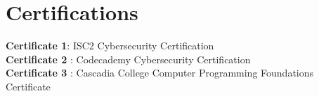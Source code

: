 \documentclass[letterpaper,11pt]{article}
\makeatletter
\newcommand{\resumeItem}[1]{
  \item\small{
    {#1 \vspace{-2pt}}
  }
}
\newcommand{\resumeProjectHeading}[2]{
    \item
    \begin{tabular*}{1.001\textwidth}{l@{\extracolsep{\fill}}r}
      \small#1 & \textbf{\small #2}\\
    \end{tabular*}\vspace{-7pt}
}
\newcommand{\resumeSubHeadingListStart}{\begin{itemize}[leftmargin=0.0in, label={}]}
\newcommand{\resumeSubHeadingListEnd}{\end{itemize}}
\newcommand{\resumeItemListStart}{\begin{itemize}}
\newcommand{\resumeItemListEnd}{\end{itemize}\vspace{-5pt}}
\makeatother
\begin{document}
\begin{comment}
\section{Publication}
\vspace{-6pt}
    \resumeSubHeadingListStart
    \resumeProjectHeading
    {\textbf{The Title of your paper} $|$ 
    \emph{\href{https://www.researchgate.net}{Publication link}}}{Month Year}
    \resumeItemListStart
            \resumeItem{Write about your paper.}
            \resumeItem{Write about your paper.}
          \resumeItemListEnd
    \resumeSubHeadingListEnd
\vspace{-16pt}
\end{comment}

\section{Certifications}
\textbf{Certificate 1}{: ISC2 Cybersecurity Certification} \\
\textbf{Certificate 2} {: Codecademy Cybersecurity Certification} \\
\textbf{Certificate 3} {: Cascadia College Computer Programming Foundations Certificate}
\end{document}
